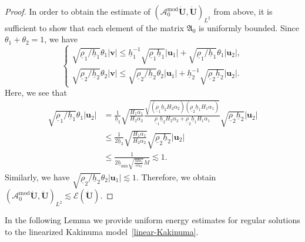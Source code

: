 \documentclass[11pt,leqno]{article}
\numberwithin{equation}{section}
\numberwithin{figure}{section}
\begin{document}
\begin{proof}
In order to obtain the estimate of $(\mathscr{A}_0^\mathrm{mod}\dot{\bm{U}},\dot{\bm{U}})_{L^2}$ from above, 
it is sufficient to show that each element of the matrix $\mathfrak{A}_0$ is uniformly bounded. 
Since $\theta_1+\theta_2=1$, we have 
%
\[
\begin{cases}
 \sqrt{\underline{\rho}_1/\underline{h}_1} \theta_1|\bm{v}|
  \leq \underline{h}_1^{-1}\sqrt{\underline{\rho}_1\underline{h}_1}|\bm{u}_1|
   + \sqrt{\underline{\rho}_1/\underline{h}_1} \theta_1|\bm{u}_2|, \\
 \sqrt{\underline{\rho}_2/\underline{h}_2} \theta_2|\bm{v}|
  \leq \sqrt{\underline{\rho}_2/\underline{h}_2} \theta_2|\bm{u}_1|
   + \underline{h}_2^{-1}\sqrt{\underline{\rho}_2\underline{h}_2}|\bm{u}_2|.
\end{cases}
\]
%
Here, we see that 
%
\begin{align*}
\sqrt{\underline{\rho}_1/\underline{h}_1} \theta_1|\bm{u}_2|
&= \frac{1}{\underline{h}_2}\sqrt{\frac{H_1\alpha_1}{H_2\alpha_2}}
 \frac{\sqrt{ (\underline{\rho}_1\underline{h}_2H_2\alpha_2) (\underline{\rho}_2\underline{h}_1H_1\alpha_1) }}{
  \underline{\rho}_1\underline{h}_2H_2\alpha_2+\underline{\rho}_2\underline{h}_1H_1\alpha_1}
 \sqrt{\underline{\rho}_2\underline{h}_2}|\bm{u}_2| \\
&\leq \frac{1}{2\underline{h}_2}\sqrt{\frac{H_1\alpha_1}{H_2\alpha_2}}\sqrt{\underline{\rho}_2\underline{h}_2}|\bm{u}_2| \\
&\leq \frac{1}{2\underline{h}_\mathrm{min} \sqrt{\frac{M\alpha_1}{c\alpha_2}}M}
 \lesssim 1.
\end{align*}
%
Similarly, we have $\sqrt{\underline{\rho}_2/\underline{h}_2} \theta_2|\bm{u}_1| \lesssim 1$. 
Therefore, we obtain 
$(\mathscr{A}_0^\mathrm{mod}\dot{\bm{U}},\dot{\bm{U}})_{L^2} \lesssim \mathscr{E}(\dot{\bm{U}})$. 
\end{proof}


In the following Lemma we provide uniform energy estimates for regular solutions to the linearized Kakinuma model~\eqref{linear-Kakinuma}. 
\end{document}
